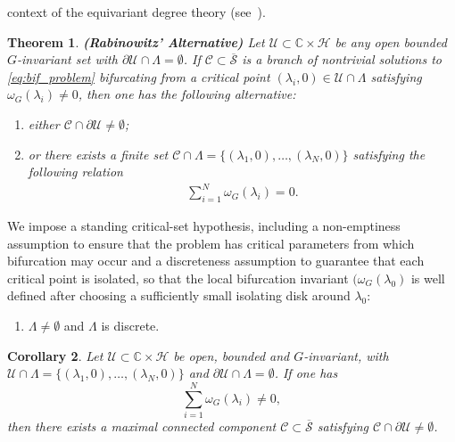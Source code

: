 \documentclass[twoside,11pt]{article}
\def\bc{{\mathbb{C}}}
\newtheorem{theorem}{Theorem}[section]
\newtheorem{corollary}[theorem]{Corollary}
\begin{document}
context of the equivariant degree theory (see~\cite{AED, book-new, survey}). 
\begin{theorem} \rm \label{thm:rab_alt}{\bf (Rabinowitz' Alternative)}
Let $\mathcal U \subset \bc \times \mathscr H$ be any open bounded $G$-invariant set with $\partial \mathcal U \cap \Lambda = \emptyset$. If $\mathscr C \subset \overline{\mathscr S}$ is a branch of nontrivial solutions to \eqref{eq:bif_problem} bifurcating from a critical point $(\lambda_i,0) \in \mathcal U \cap \Lambda$ satisfying $\omega_G(\lambda_i) \neq 0$, then one has the following alternative:
\begin{enumerate}[label=$(\alph*)$]
\item\label{alt_a}  either $\mathscr C \cap \partial \mathcal U \neq \emptyset$;
    \item\label{alt_b} or there exists a finite set $\mathscr C \cap \Lambda = \{ (\lambda_1,0), \ldots, (\lambda_{N},0) \}$
    satisfying the following relation
    \begin{align*}
\sum\limits_{i=1}^{N}\omega_G(\lambda_i) = 0.
    \end{align*}
\end{enumerate} 
\end{theorem}
We impose a standing critical-set hypothesis, including a non-emptiness assumption to ensure that the problem has critical parameters from which bifurcation may occur and a discreteness assumption to guarantee that each critical point is isolated, so that the local bifurcation invariant $(\omega_G(\lambda_0)$ is well defined after choosing a sufficiently small
isolating disk around $\lambda_0$:
\begin{enumerate}[label=($B_0$)] 
    \item\label{b0} $\Lambda \neq \emptyset$ and $\Lambda$ is discrete.
\end{enumerate}
\begin{corollary}\label{cor:macro_escape}
Let $\mathcal U\subset \bc\times\mathscr H$ be open, bounded and $G$-invariant, with $\mathcal U\cap\Lambda=\{(\lambda_1,0),\ldots, (\lambda_N,0)\}$ and $\partial\mathcal U\cap\Lambda=\emptyset$. If one has
\[
\sum_{i=1}^N \omega_G(\lambda_i)\neq 0,
\]
then there exists a maximal connected component
$\mathscr C\subset\overline{\mathscr S}$ satisfying $\mathscr C\cap\partial\mathcal U\neq\emptyset$.
\end{corollary}
\end{document}

